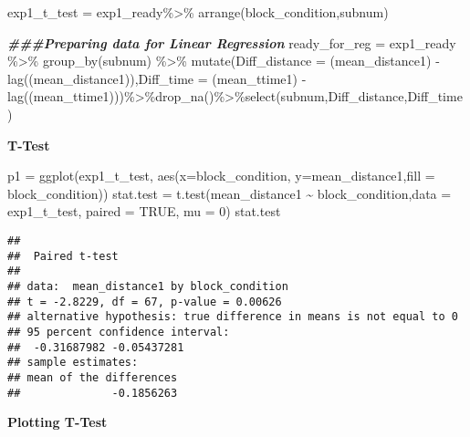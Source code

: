 \documentclass[
]{article}
\newenvironment{Shaded}{\begin{snugshade}}{\end{snugshade}}
\newcommand{\AttributeTok}[1]{\textcolor[rgb]{0.77,0.63,0.00}{#1}}
\newcommand{\ConstantTok}[1]{\textcolor[rgb]{0.00,0.00,0.00}{#1}}
\newcommand{\DecValTok}[1]{\textcolor[rgb]{0.00,0.00,0.81}{#1}}
\newcommand{\DocumentationTok}[1]{\textcolor[rgb]{0.56,0.35,0.01}{\textbf{\textit{#1}}}}
\newcommand{\FunctionTok}[1]{\textcolor[rgb]{0.00,0.00,0.00}{#1}}
\newcommand{\NormalTok}[1]{#1}
\newcommand{\OtherTok}[1]{\textcolor[rgb]{0.56,0.35,0.01}{#1}}
\newcommand{\SpecialCharTok}[1]{\textcolor[rgb]{0.00,0.00,0.00}{#1}}
\begin{document}
\begin{Shaded}
\begin{Highlighting}[]
\NormalTok{exp1\_t\_test }\OtherTok{=}\NormalTok{ exp1\_ready}\SpecialCharTok{\%\textgreater{}\%} \FunctionTok{arrange}\NormalTok{(block\_condition,subnum)}


\DocumentationTok{\#\#\#Preparing data for Linear Regression}
\NormalTok{ready\_for\_reg }\OtherTok{=}\NormalTok{ exp1\_ready }\SpecialCharTok{\%\textgreater{}\%}
  \FunctionTok{group\_by}\NormalTok{(subnum) }\SpecialCharTok{\%\textgreater{}\%}
  \FunctionTok{mutate}\NormalTok{(}\AttributeTok{Diff\_distance =}\NormalTok{ (mean\_distance1) }\SpecialCharTok{{-}} \FunctionTok{lag}\NormalTok{((mean\_distance1)),}\AttributeTok{Diff\_time =}\NormalTok{ (mean\_ttime1) }\SpecialCharTok{{-}} \FunctionTok{lag}\NormalTok{((mean\_ttime1)))}\SpecialCharTok{\%\textgreater{}\%}\FunctionTok{drop\_na}\NormalTok{()}\SpecialCharTok{\%\textgreater{}\%}\FunctionTok{select}\NormalTok{(subnum,Diff\_distance,Diff\_time)}
\end{Highlighting}
\end{Shaded}

\textbf{T-Test}

\begin{Shaded}
\begin{Highlighting}[]
\NormalTok{p1 }\OtherTok{=} \FunctionTok{ggplot}\NormalTok{(exp1\_t\_test, }\FunctionTok{aes}\NormalTok{(}\AttributeTok{x=}\NormalTok{block\_condition, }\AttributeTok{y=}\NormalTok{mean\_distance1,}\AttributeTok{fill =}\NormalTok{ block\_condition))}
\NormalTok{stat.test }\OtherTok{=} \FunctionTok{t.test}\NormalTok{(mean\_distance1 }\SpecialCharTok{\textasciitilde{}}\NormalTok{ block\_condition,}\AttributeTok{data =}\NormalTok{ exp1\_t\_test, }\AttributeTok{paired =} \ConstantTok{TRUE}\NormalTok{, }\AttributeTok{mu =} \DecValTok{0}\NormalTok{)}
\NormalTok{stat.test}
\end{Highlighting}
\end{Shaded}

\begin{verbatim}
## 
##  Paired t-test
## 
## data:  mean_distance1 by block_condition
## t = -2.8229, df = 67, p-value = 0.00626
## alternative hypothesis: true difference in means is not equal to 0
## 95 percent confidence interval:
##  -0.31687982 -0.05437281
## sample estimates:
## mean of the differences 
##              -0.1856263
\end{verbatim}

\textbf{Plotting T-Test}
\end{document}
